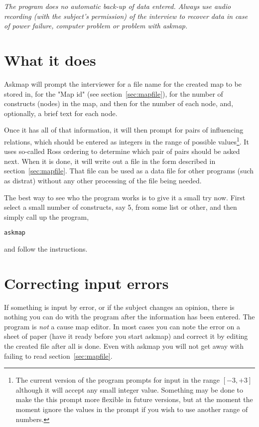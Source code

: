 \documentclass[%
	11pt,
        a4paper,
        twoside]{workrep}
\newcommand*{\prg}[1]{\textsf{#1}}		%
\begin{document}
\emph{The program does no automatic back-up of data entered.  Always use
audio recording (with the subject's permission) of the interview
to recover data in case of power failure, computer problem or problem
with \prg{askmap}.}

\section{What it does}

\prg{Askmap} will prompt the interviewer for a file name for the
created map to be stored in, for the "Map id" (see section~\ref{sec:mapfile}),
for the number of constructs (nodes) in the map, and then for the
number of each node, and, optionally, a brief text for each node.

Once it has all of that information, it will then prompt for pairs of
influencing relations, which should be entered as integers in the
range of possible values\footnote{%
  The current version of the program prompts for input in the range
  $[-3,+3]$ although it will accept any small integer value.  Something
  may be done to make the this prompt more flexible in future versions,
  but at the moment the moment ignore the values in the prompt if you
  wish to use another range of numbers.}.
It uses so-called Ross ordering to determine which pair of pairs should
be asked next.  When it is done, it will write out a file in the form
described in section~\ref{sec:mapfile}.  That file can be used as
a data file for other programs (such as \prg{distrat}) without any
other processing of the file being needed.

The best way to see who the program works is to give it a small try
now.  First select a small number of constructs, say 5, from some
list or other, and then simply call up the program,
\begin{alltt}
  askmap
\end{alltt}
and follow the instructions.

\section{Correcting input errors}

If something is input by error, or if the subject changes an opinion, there
is nothing you can do with the program after the information has been
entered.  The program is \emph{not} a cause map editor.  In most
cases you can note the error on a sheet of paper (have it ready before you
start \prg{askmap}) and correct it by editing the created file after all is
done.  Even with \prg{askmap} you will not get away with failing to
read section~\ref{sec:mapfile}.
\end{document}
